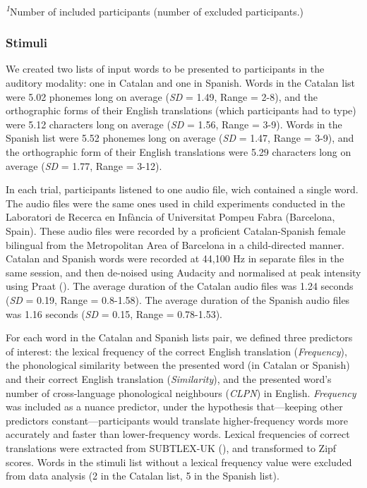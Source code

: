 \documentclass[
]{article}
\begin{document}
\begin{minipage}{\linewidth}
\textsuperscript{\textit{1}}Number of included participants (number of excluded participants.)\\
\end{minipage}

\subsubsection{Stimuli}\label{stimuli}

We created two lists of input words to be presented to participants in
the auditory modality: one in Catalan and one in Spanish. Words in the
Catalan list were 5.02 phonemes long on average (\emph{SD} = 1.49, Range
= 2-8), and the orthographic forms of their English translations (which
participants had to type) were 5.12 characters long on average
(\emph{SD} = 1.56, Range = 3-9). Words in the Spanish list were 5.52
phonemes long on average (\emph{SD} = 1.47, Range = 3-9), and the
orthographic form of their English translations were 5.29 characters
long on average (\emph{SD} = 1.77, Range = 3-12).

In each trial, participants listened to one audio file, wich contained a
single word. The audio files were the same ones used in child
experiments conducted in the Laboratori de Recerca en Infància of
Universitat Pompeu Fabra (Barcelona, Spain). These audio files were
recorded by a proficient Catalan-Spanish female bilingual from the
Metropolitan Area of Barcelona in a child-directed manner. Catalan and
Spanish words were recorded at 44,100 Hz in separate files in the same
session, and then de-noised using Audacity and normalised at peak
intensity using Praat (). The average duration of the Catalan audio files was
1.24 seconds (\emph{SD} = 0.19, Range = 0.8-1.58). The average duration
of the Spanish audio files was 1.16 seconds (\emph{SD} = 0.15, Range =
0.78-1.53).

For each word in the Catalan and Spanish lists pair, we defined three
predictors of interest: the lexical frequency of the correct English
translation (\emph{Frequency}), the phonological similarity between the
presented word (in Catalan or Spanish) and their correct English
translation (\emph{Similarity}), and the presented word's number of
cross-language phonological neighbours (\emph{CLPN}) in English.
\emph{Frequency} was included as a nuance predictor, under the
hypothesis that---keeping other predictors constant---participants would
translate higher-frequency words more accurately and faster than
lower-frequency words. Lexical frequencies of correct translations were
extracted from SUBTLEX-UK (), and transformed to Zipf scores. Words in the stimuli list
without a lexical frequency value were excluded from data analysis (2 in
the Catalan list, 5 in the Spanish list).
\end{document}
